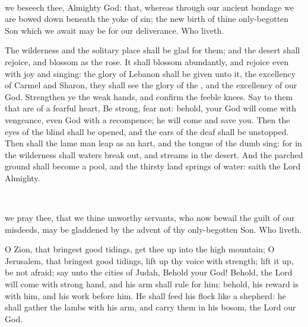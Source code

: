 \\


\collect
{} we beseech thee, Almighty God: that, whereas through our ancient bondage we are bowed down beneath the yoke of sin; the new birth of thine only-begotten Son which we await may be for our deliverance. Who liveth.

 The wilderness and the solitary place shall be glad for them; and the desert shall rejoice, and blossom as the rose. It shall blossom abundantly, and rejoice even with joy and singing: the glory of Lebanon shall be given unto it, the excellency of Carmel and Sharon, they shall see the glory of the , and the excellency of our God. Strengthen ye the weak hands, and confirm the feeble knees. Say to them that are of a fearful heart, Be strong, fear not: behold, your God will come with vengeance, even God with a recompence; he will come and save you. Then the eyes of the blind shall be opened, and the ears of the deaf shall be unstopped. Then shall the lame man leap as an hart, and the tongue of the dumb sing: for in the wilderness shall waters break out, and streams in the desert. And the parched ground shall become a pool, and the thirsty land springs of water: saith the Lord Almighty.

\\


\collect
{} we pray thee, that we thine unworthy servants, who now bewail the guilt of our misdeeds, may be gladdened by the advent of thy only-begotten Son. Who liveth.

 O Zion, that bringest good tidings, get thee up into the high mountain; O Jerusalem, that bringest good tidings, lift up thy voice with strength; lift it up, be not afraid; say unto the cities of Judah, Behold your God! Behold, the Lord  will come with strong hand, and his arm shall rule for him: behold, his reward is with him, and his work before him. He shall feed his flock like a shepherd: he shall gather the lambs with his arm, and carry them in his bosom, the Lord our God.

